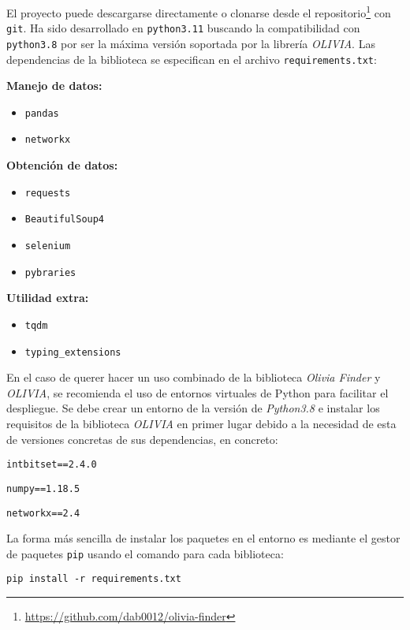 El proyecto puede descargarse directamente o clonarse desde el repositorio\footnote{\url{https://github.com/dab0012/olivia-finder}}
con \texttt{git}. Ha sido desarrollado en \texttt{python3.11} buscando la compatibilidad con \texttt{python3.8} por
ser la máxima versión soportada por la librería \textit{OLIVIA}.
Las dependencias de la biblioteca se especifican en el archivo \texttt{requirements.txt}:


\textbf{Manejo de datos:}
\begin{itemize}
    \item \texttt{pandas}
    \item \texttt{networkx}
\end{itemize}

\textbf{Obtención de datos:}
\begin{itemize}
    \item \texttt{requests}
    \item \texttt{BeautifulSoup4}
    \item \texttt{selenium}
    \item \texttt{pybraries}
\end{itemize}

\textbf{Utilidad extra:}
\begin{itemize}
    \item \texttt{tqdm}
    \item \texttt{typing\_extensions}
\end{itemize}

En el caso de querer hacer un uso combinado de la biblioteca \textit{Olivia Finder} y \textit{OLIVIA}, se recomienda el uso de entornos
virtuales de Python para facilitar el despliegue. Se debe crear un entorno de la versión de \textit{Python3.8} e instalar los
requisitos de la biblioteca \textit{OLIVIA} en primer lugar debido a la necesidad de esta de versiones concretas de sus
dependencias, en concreto:

\begin{center}

    \texttt{intbitset==2.4.0}

    \texttt{numpy==1.18.5}

    \texttt{networkx==2.4}

\end{center}

La forma más sencilla de instalar los paquetes en el entorno es mediante el gestor de paquetes \texttt{pip} usando el
comando para cada biblioteca:

\begin{center}
    \texttt{pip install -r requirements.txt}
\end{center}

